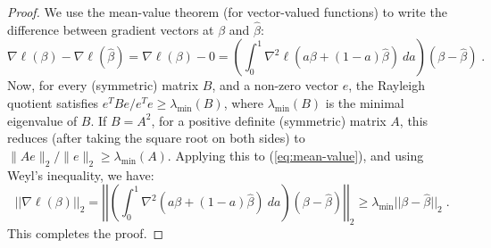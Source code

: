\documentclass[11pt]{article}
\begin{document}
\begin{proof}
We  use the mean-value theorem (for vector-valued functions) to write the difference between gradient vectors at $\beta$ and $\hat{\beta}$:
\begin{equation} \label{eq:mean-value}
\nabla\ell(\beta) - \nabla\ell(\hat{\beta}) = \nabla\ell(\beta) - 0 = \left(\int_0^1 \! \nabla^2\ell(a\beta +(1-a)\hat{\beta}) \ da \right)(\beta-\hat{\beta})  \; .
\end{equation}
Now, for every (symmetric) matrix $B$, and a non-zero vector $e$, the Rayleigh quotient satisfies $e^T Be/e^T e\geq \lambda_{\text{min}}(B)$, where $\lambda_{\text{min}}(B)$ is the minimal eigenvalue of $B$. If $B=A^2$, for a positive definite (symmetric) matrix $A$, this reduces (after taking the square root on both sides) to $\|Ae\|_2/ \|e\|_2 \geq \lambda_{\text{min}}(A)$.  Applying this to (\ref{eq:mean-value}), and using Weyl's inequality, we have:
\begin{equation} 
||\nabla\ell(\beta)||_2 = \left|\left|\left(\int_0^1 \! \nabla^2(a\beta +(1-a)\hat{\beta}) \ da \right)(\beta-\hat{\beta})\right|\right|_2 \geq \lambda_{\text{min}} ||\beta-\hat{\beta}||_2 \; .
\end{equation}
This completes the proof.
\end{proof}
\end{document}
